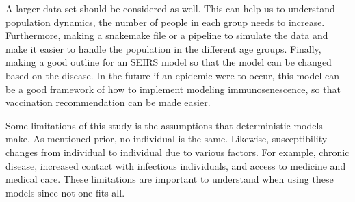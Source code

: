 \documentclass{report}
\begin{document}
A larger data set should be considered as well. This can help us to understand population dynamics, the number of people in each group needs to increase.
Furthermore, making a snakemake file or a pipeline to simulate the data and make it easier to handle the population in the different age groups. Finally, making a good outline for an SEIRS model so that the model can be changed based on the disease. In the future if an epidemic were to occur, this model can be a good framework of how to implement modeling immunosenescence, so that vaccination recommendation can be made easier. 

Some limitations of this study is the assumptions that deterministic models make. As mentioned prior, no individual is the same. Likewise, susceptibility changes from individual to individual due to various factors. For example, chronic disease, increased contact with infectious individuals, and access to medicine and medical care. These limitations are important to understand when using these models since not one fits all.
\end{document}

